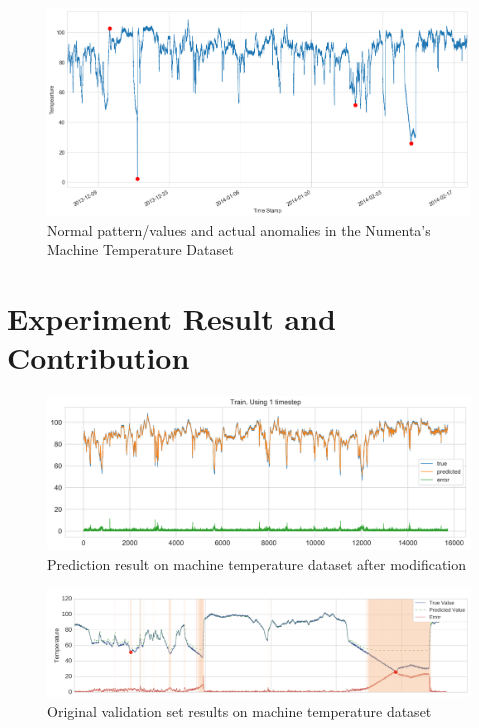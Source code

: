 \documentclass{article}
\begin{document}
\begin{figure}[htb]
	    \centering
\includegraphics[scale=0.21]{png/o-actualAnomalies.png}
    \caption{Normal pattern/values and actual anomalies in the Numenta’s
Machine
Temperature Dataset}
    \label{fig:actualAnomalies}
\end{figure}



\section{Experiment Result and Contribution}

\begin{figure}[htb]
	    \centering
\includegraphics[scale=0.21]{png/m-prediction.png}
    \caption{Prediction result on machine temperature dataset after
modification}
    \label{fig:m-prediction}
\end{figure}

\begin{figure}[htb]
	    \centering
\includegraphics[scale=0.41]{png/o-validationResult.png}
    \caption{Original validation set results on machine temperature dataset}
    \label{fig:o-validationResult}
\end{figure}
\end{document}
